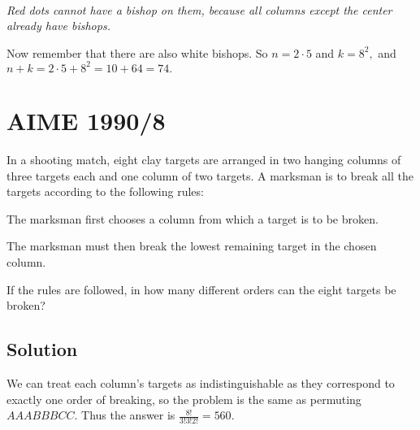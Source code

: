 \documentclass[blue,onecol]{shooting}
\begin{document}
\begin{center}
\\[\baselineskip]
\textit{Red dots cannot have a bishop on them, because all columns except the center already have bishops.}
\end{center}

Now remember that there are also white bishops. So $n=2\cdot 5$ and $k=8^2,$ and $n+k=2\cdot 5+8^2=10+64=74.$
\section{AIME 1990/8}
In a shooting match, eight clay targets are arranged in two hanging columns of three targets each and one column of two targets. A marksman is to break all the targets according to the following rules:

    \begin{itemize}
         \Item The marksman first chooses a column from which a target is to be broken.

         \Item The marksman must then break the lowest remaining target in the chosen column.
    \end{itemize}

    If the rules are followed, in how many different orders can the eight targets be broken?

\subsection{Solution}

We can treat each column's targets as indistinguishable as they correspond to exactly one order of breaking, so the problem is the same as permuting $AAABBBCC.$ Thus the answer is $\frac{8!}{3!3!2!}=560.$
\end{document}
